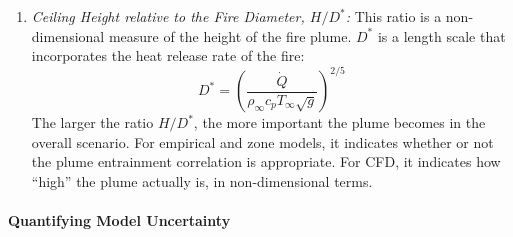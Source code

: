 \documentclass[graybox]{svmult}
\begin{document}
\begin{enumerate}
\item {\em Ceiling Height relative to the Fire Diameter, $H/D^*$:}
This ratio is a non-dimensional measure of the height of the fire plume.
$D^*$ is a length scale that incorporates the heat release rate of the fire:
\begin{equation}
   D^* = \left( \frac{\dot{Q}}{\rho_\infty c_p T_\infty \sqrt{g}} \right)^{2/5} \label{Dstar}
\end{equation}
The larger the ratio $H/D^*$, the more important the plume becomes in the overall scenario. For empirical and zone models, it indicates whether or not the plume entrainment correlation is appropriate. For CFD, it indicates how ``high'' the plume actually is, in non-dimensional terms.
\end{enumerate}


\paragraph{Quantifying Model Uncertainty}
\end{document}
